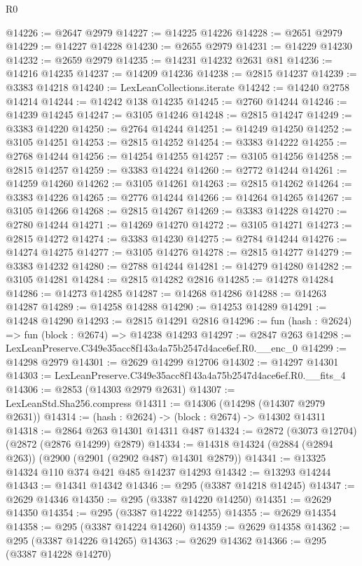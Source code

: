 \begin{lexlean}{R0}
\begin{coremodule}
@14226 := @2647 @2979
@14227 := @14225 @14226
@14228 := @2651 @2979
@14229 := @14227 @14228
@14230 := @2655 @2979
@14231 := @14229 @14230
@14232 := @2659 @2979
@14235 := @14231 @14232 @2631 @81
@14236 := @14216 @14235
@14237 := @14209 @14236
@14238 := @2815 @14237
@14239 := @3383 @14218
@14240 := LexLeanCollections.iterate
@14242 := @14240 @2758 @14214
@14244 := @14242 @138 @14235
@14245 := @2760 @14244
@14246 := @14239 @14245
@14247 := @3105 @14246
@14248 := @2815 @14247
@14249 := @3383 @14220
@14250 := @2764 @14244
@14251 := @14249 @14250
@14252 := @3105 @14251
@14253 := @2815 @14252
@14254 := @3383 @14222
@14255 := @2768 @14244
@14256 := @14254 @14255
@14257 := @3105 @14256
@14258 := @2815 @14257
@14259 := @3383 @14224
@14260 := @2772 @14244
@14261 := @14259 @14260
@14262 := @3105 @14261
@14263 := @2815 @14262
@14264 := @3383 @14226
@14265 := @2776 @14244
@14266 := @14264 @14265
@14267 := @3105 @14266
@14268 := @2815 @14267
@14269 := @3383 @14228
@14270 := @2780 @14244
@14271 := @14269 @14270
@14272 := @3105 @14271
@14273 := @2815 @14272
@14274 := @3383 @14230
@14275 := @2784 @14244
@14276 := @14274 @14275
@14277 := @3105 @14276
@14278 := @2815 @14277
@14279 := @3383 @14232
@14280 := @2788 @14244
@14281 := @14279 @14280
@14282 := @3105 @14281
@14284 := @2815 @14282 @2816
@14285 := @14278 @14284
@14286 := @14273 @14285
@14287 := @14268 @14286
@14288 := @14263 @14287
@14289 := @14258 @14288
@14290 := @14253 @14289
@14291 := @14248 @14290
@14293 := @2815 @14291 @2816
@14296 := fun (hash : @2624) => fun (block : @2674) => @14238 @14293
@14297 := @2847 @263
@14298 := LexLeanPreserve.C349e35acc8f143a4a75b2547d4ace6ef.R0.__enc_0
@14299 := @14298 @2979
@14301 := @2629 @14299 @12706
@14302 := @14297 @14301
@14303 := LexLeanPreserve.C349e35acc8f143a4a75b2547d4ace6ef.R0.__fits_4
@14306 := @2853 (@14303 @2979 @2631)
@14307 := LexLeanStd.Sha256.compress
@14311 := @14306 (@14298 (@14307 @2979 @2631))
@14314 := (hash : @2624) -> (block : @2674) -> @14302 @14311
@14318 := @2864 @263 @14301 @14311 @487
@14324 := @2872 (@3073 @12704) (@2872 (@2876 @14299) @2879)
@14334 := @14318 @14324 (@2884 (@2894 @263)) (@2900 (@2901 (@2902 @487) @14301 @2879))
@14341 := @13325 @14324 @110 @374 @421 @485 @14237 @14293
@14342 := @13293 @14244
@14343 := @14341 @14342
@14346 := @295 (@3387 @14218 @14245)
@14347 := @2629 @14346
@14350 := @295 (@3387 @14220 @14250)
@14351 := @2629 @14350
@14354 := @295 (@3387 @14222 @14255)
@14355 := @2629 @14354
@14358 := @295 (@3387 @14224 @14260)
@14359 := @2629 @14358
@14362 := @295 (@3387 @14226 @14265)
@14363 := @2629 @14362
@14366 := @295 (@3387 @14228 @14270)

\end{coremodule}
\end{lexlean}
